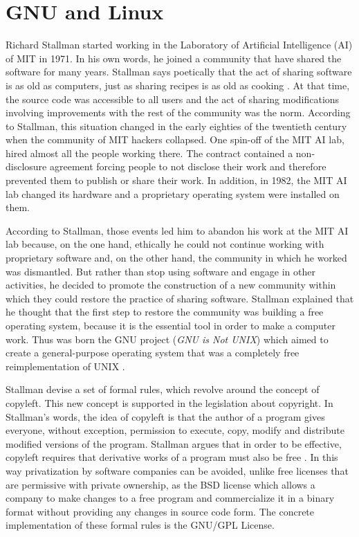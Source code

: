 \section{GNU and Linux}

Richard Stallman started working in the Laboratory of Artificial Intelligence (AI) of MIT in 1971. In his own words, he joined a community that have shared the software for many years. Stallman says poetically that the act of sharing software is as old as computers, just as sharing recipes is as old as cooking \citep{stallman:1998}. At that time, the source code was accessible to all users and the act of sharing modifications involving improvements with the rest of the community was the norm. According to Stallman, this situation changed in the early eighties of the twentieth century when the community of MIT hackers collapsed. One spin-off of the MIT AI lab, hired almost all the people working there. The contract contained a non-disclosure agreement forcing people to not disclose their work and therefore prevented them to publish or share their work. In addition, in 1982, the MIT AI lab changed its hardware and a proprietary operating system were installed on them.

According to Stallman, those events led him to abandon his work at the MIT AI lab because, on the one hand, ethically he could not continue working with proprietary software and, on the other hand, the community in which he worked was dismantled. But rather than stop using software and engage in other activities, he decided to promote the construction of a new community within which they could restore the practice of sharing software. Stallman explained that he thought that the first step to restore the community was building a free operating system, because it is the essential tool in order to make a computer work. Thus was born the GNU project (\emph{GNU is Not UNIX}) which aimed to create a general-purpose operating system that was a completely free reimplementation of UNIX  \citep{stallman:1985}.

Stallman devise a set of formal rules, which revolve around the concept of copyleft. This new concept is supported in the legislation about copyright. In Stallman's words, the idea of copyleft is that the author of a program gives everyone, without exception, permission to execute, copy, modify and distribute modified versions of the program. Stallman argues that in order to be effective, copyleft requires that derivative works of a program must also be free \citep{stallman:1998}. In this way privatization by software companies can be avoided, unlike free licenses that are permissive with private ownership, as the BSD license which allows a company to make changes to a free program and commercialize it in a binary format without providing any changes in source code form. The concrete implementation of these formal rules is the GNU/GPL License.

